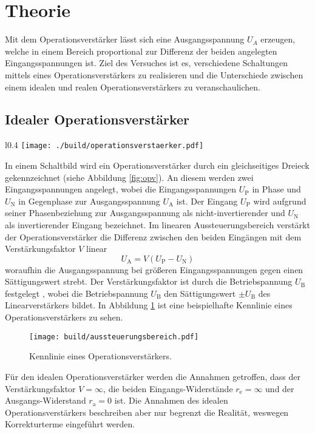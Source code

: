 \section{Theorie}\label{sec:theorie}
Mit dem Operationsverstärker lässt sich eine Ausgangsspannung $U_A$
erzeugen, welche in einem Bereich proportional zur Differenz der beiden
angelegten Eingangsspannungen ist.
Ziel des Versuches ist es, verschiedene Schaltungen mittels eines
Operationsverstärkers zu realisieren und die Unterschiede zwischen einem idealen
und realen Operationsverstärkers zu veranschaulichen.

\subsection{Idealer Operationsverstärker}%
\label{sub:idealer_operationsverstaerker}

\begin{wrapfigure}{l}{0.4\textwidth}
		\centering
		\texttt{[image: ./build/operationsverstaerker.pdf]}
		\caption{Schaltbild eines idealen Operationsverstärkers.
		\cite{anleitung}}
		\label{fig:opv}
\end{wrapfigure}
In einem Schaltbild wird ein Operationsverstärker durch ein gleichseitiges
Dreieck gekennzeichnet (siehe Abbildung \ref{fig:opv}).
An diesem werden zwei Eingangsspannungen angelegt, wobei die
Eingangsspannungen $U_\text{P}$ in Phase
und $U_\text{N}$ in Gegenphase zur Ausgangsspannung
$U_\text{A}$ ist.
Der Eingang $U_\text{P}$ wird aufgrund seiner Phasenbeziehung zur Ausgangsspannung
als nicht-invertierender und $U_\text{N}$ als invertierender Eingang bezeichnet.
Im linearen Aussteuerungsbereich verstärkt der Operationsverstärker die
Differenz zwischen den beiden Eingängen mit dem Verstärkungsfaktor $V$ linear
\begin{equation}
		\label{eq:diff}
		U_\text{A} = V \left( U_\text{P} - U_\text{N} \right)
\end{equation}
woraufhin die Ausgangsspannung bei größeren Eingangsspannungen gegen einen
Sättigungswert strebt.
Der Verstärkungsfaktor ist durch die Betriebspannung $U_\text{B}$ festgelegt
, wobei die Betriebspannung $U_\text{B}$ den Sättigungswert $\pm U_\text{B}$ des
Linearverstärkers bildet.
In Abbildung \ref{fig:kennlinie} ist eine beispielhafte Kennlinie eines
Operationsverstärkers zu sehen.
\begin{figure}[ht]
		\centering
		\texttt{[image: build/aussteuerungsbereich.pdf]}
		\caption{Kennlinie eines Operationsverstärkers. \cite{anleitung}}
		\label{fig:kennlinie}
\end{figure}
Für den idealen Operationsverstärker werden die Annahmen getroffen, dass der
Verstärkungsfaktor $V = \infty$, die beiden Eingangs-Widerstände $r_\text{e}
= \infty$ und der Ausgangs-Widerstand $r_\text{a} = 0$ ist.
Die Annahmen des idealen Operationsverstärkers beschreiben aber nur begrenzt
die Realität, weswegen Korrekturterme eingeführt werden.


